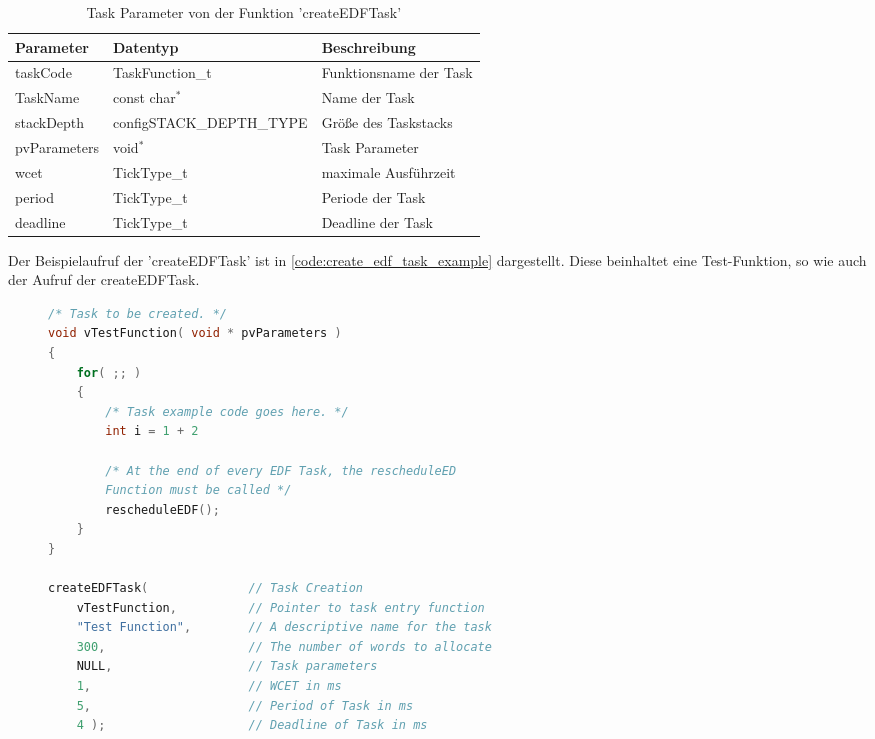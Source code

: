 \documentclass[../EDF Master Thesis.tex]{subfiles}
\begin{document}
    \begin{table}[H]
        \centering
        \begin{tabular}{l|l|l}
            Parameter & Datentyp & Beschreibung \\
            \hline
            taskCode & TaskFunction\_t & Funktionsname der Task \\
            TaskName & const char\( ^* \) & Name der Task  \\
            stackDepth & configSTACK\_DEPTH\_TYPE & Größe des Taskstacks \\
            pvParameters & void\( ^* \) & Task Parameter \\
            wcet & TickType\_t & maximale Ausführzeit \\ 
            period & TickType\_t & Periode der Task \\
            deadline & TickType\_t & Deadline der Task \\
        \end{tabular}
        \caption{Task Parameter von der Funktion 'createEDFTask'}
        \label{table:task_parameter_von_der_funktion_createEDFTask}
    \end{table}

    Der Beispielaufruf der 'createEDFTask' ist in \autoref{code:create_edf_task_example} dargestellt.
    Diese beinhaltet eine Test-Funktion, so wie auch der Aufruf der createEDFTask.

\begin{figure}[ht!]
\begin{lstlisting}[language=C, caption=createEDFTask Beispiel, label=code:create_edf_task_example]
/* Task to be created. */
void vTestFunction( void * pvParameters )
{
    for( ;; )
    {
        /* Task example code goes here. */
        int i = 1 + 2

        /* At the end of every EDF Task, the rescheduleED
        Function must be called */
        rescheduleEDF();
    }
}

createEDFTask(              // Task Creation
    vTestFunction,          // Pointer to task entry function
    "Test Function",        // A descriptive name for the task
    300,                    // The number of words to allocate
    NULL,                   // Task parameters 
    1,                      // WCET in ms
    5,                      // Period of Task in ms
    4 );                    // Deadline of Task in ms
\end{lstlisting}
\end{figure}
\end{document}
